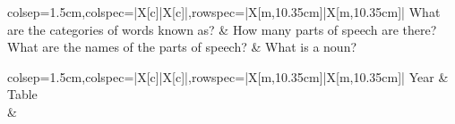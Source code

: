 \documentclass[a4paper]{extarticle}
\begin{document}
\huge

\hspace{-0.67cm}
\begin{tblr}{colsep=1.5cm,colspec={|X[c]|X[c]|},rowspec={|X[m,10.35cm]|X[m,10.35cm]|}}
    {What are the categories of words known as?} & 
    {How many parts of speech are there?} 
    \\
    {What are the names of the parts of speech?} & 
    {What is a noun?} 
    \\
\end{tblr}

\hspace{-0.67cm}
\begin{tblr}{colsep=1.5cm,colspec={|X[c]|X[c]|},rowspec={|X[m,10.35cm]|X[m,10.35cm]|}}
    {Year} &
    {Table} \\
    {} &
    {} \\
\end{tblr}
\end{document}
